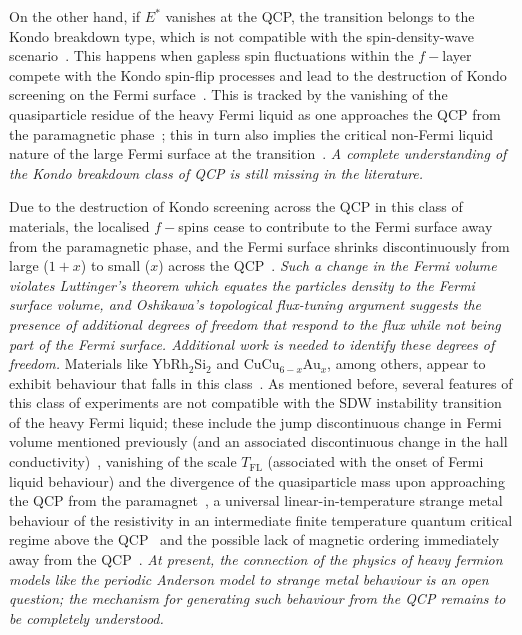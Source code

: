 On the other hand, if \(E^*\) vanishes at the QCP, the transition belongs to the Kondo breakdown type, which is not compatible with the spin-density-wave scenario~\cite{stockert_2011_annurev}. This happens when gapless spin fluctuations within the \(f-\)layer compete with the Kondo spin-flip processes and lead to the destruction of Kondo screening on the Fermi surface~\cite{Gegenwart2008}. This is tracked by the vanishing of the quasiparticle residue of the heavy Fermi liquid as one approaches the QCP from the paramagnetic phase~\cite{Si2001,si_2003}; this in turn also implies the critical non-Fermi liquid nature of the large Fermi surface at the transition~\cite{wolfe_2011}. {\it A complete understanding of the Kondo breakdown class of QCP is still missing in the literature.}

Due to the destruction of Kondo screening across the QCP in this class of materials, the localised \(f-\)spins cease to contribute to the Fermi surface away from the paramagnetic phase, and the Fermi surface shrinks discontinuously from large (\(1+x\)) to small (\(x\)) across the QCP~\cite{si_2010}. {\it Such a change in the Fermi volume violates Luttinger's theorem which equates the particles density to the Fermi surface volume, and Oshikawa's topological flux-tuning argument suggests the presence of additional degrees of freedom that respond to the flux while not being part of the Fermi surface. Additional work is needed to identify these degrees of freedom.} Materials like YbRh$_2$Si$_2$ and CuCu$_{6-x}$Au$_x$, among others, appear to exhibit behaviour that falls in this class~\cite{trovarelli_2000,lohneysen_1996}. As mentioned before, several features of this class of experiments are not compatible with the SDW instability transition of the heavy Fermi liquid; these include the jump discontinuous change in Fermi volume mentioned previously (and an associated discontinuous change in the hall conductivity)~\cite{friedemann_2010}, vanishing of the scale \(T_\text{FL}\) (associated with the onset of Fermi liquid behaviour) and the divergence of the quasiparticle mass upon approaching the QCP from the paramagnet~\cite{stockert_2011_annurev}, a universal linear-in-temperature strange metal behaviour of the resistivity in an intermediate finite temperature quantum critical regime above the QCP~\cite{prochaska_2020,trovarelli_2000} and the possible lack of magnetic ordering immediately away from the QCP~\cite{friedemann_2009,maksimovic_2022}. {\it At present, the connection of the physics of heavy fermion models like the periodic Anderson model to strange metal behaviour is an open question; the mechanism for generating such behaviour from the QCP remains to be completely understood.}

